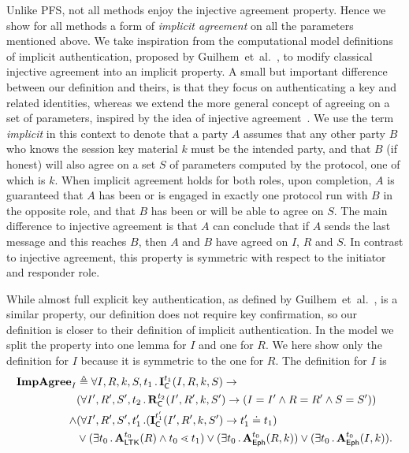 Unlike PFS, not all \mEdhoc{} methods enjoy the injective agreement property.
%
Hence we show for all methods a form of \emph{implicit agreement} on all the
parameters mentioned above.
%
We take inspiration from the computational model definitions of implicit
authentication, proposed by Guilhem~et~al.~\cite{DBLP:conf/csfw/GuilhemFW20}, to
modify classical injective agreement into an implicit property.
%
A small but important difference between our definition and theirs, is that
they focus on
authenticating a key and related identities, whereas we extend the more general
concept of agreeing on a set of parameters, inspired by the idea of injective
agreement~\cite{DBLP:conf/csfw/Lowe97a}.
%
We use the term \emph{implicit} in this context to denote that a party $A$
assumes that any other party $B$ who knows the session key material $k$ must
be the intended party, and that $B$ (if honest) will also agree on a set
$S$ of parameters computed by the protocol, one of which is $k$.
%
When implicit agreement holds for both roles, upon completion, $A$ is guaranteed
that $A$ has been or is engaged in exactly one protocol run with $B$ in the
opposite role, and that $B$ has been or will be able to agree on $S$.
%
The main difference to injective agreement is that $A$ can conclude that if
$A$ sends the last message and this reaches $B$, then $A$ and $B$ have agreed
on $I$, $R$ and $S$.
%
In contrast to injective agreement, this property is symmetric with respect to
the initiator and responder role.
%

%
While almost full explicit key authentication, as defined by
Guilhem~et~al.~\cite{DBLP:conf/csfw/GuilhemFW20}, is a similar property, our
definition does not require key confirmation, so our definition is closer to
their definition of implicit authentication.
%
In the \mTamarin{} model we split the property into one lemma for
$I$ and one for $R$.
%
We here show only the definition for $I$ because it is symmetric to the one
for $R$.
%
The definition for $I$ is
\begin{align*}
    \mathbf{ImpAgree}_I& \triangleq
    \forall I, R, k, S, t_1\operatorname{.} \mathbf{I}_{\textsf{C}}^{t_1}(I, R, k, S)
    \rightarrow\\
      &(\forall I', R', S', t_2\operatorname{.} \mathbf{R}_{\textsf{C}}^{t_2}(I', R', k, S') \rightarrow
             (I=I' \land R=R' \land S=S'))\\
      \land &(\forall I', R', S', t_1'\operatorname{.}
        (\mathbf{I}_{\textsf{C}}^{t_1'}(I', R', k, S') \rightarrow t_1' \doteq t_1
        )\\
    &\lor(\exists t_0\operatorname{.} \mathbf{A}_{\textsf{LTK}}^{t_0}(R) \land t_0 \lessdot t_1)
    \lor(\exists t_0\operatorname{.} \mathbf{A}_{\textsf{Eph}}^{t_0}(R, k))
    \lor(\exists t_0\operatorname{.} \mathbf{A}_{\textsf{Eph}}^{t_0}(I, k)).
\end{align*}
%


